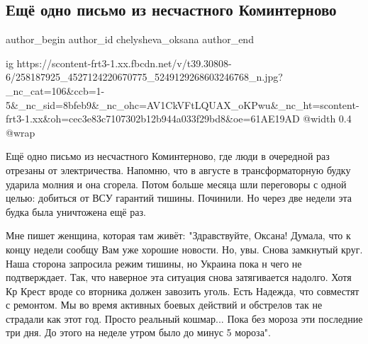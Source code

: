  
 
 
 
 
 
\subsection{Ещё одно письмо из несчастного Коминтерново}
\label{sec:21_11_2021.fb.chelysheva_oksana.1.pismo_kominternovo}
 
\ifcmt
 author_begin
   author_id chelysheva_oksana
 author_end
\fi

\ifcmt
  ig https://scontent-frt3-1.xx.fbcdn.net/v/t39.30808-6/258187925_4527124220670775_5249129268603246768_n.jpg?_nc_cat=106&ccb=1-5&_nc_sid=8bfeb9&_nc_ohc=AV1CkVFtLQUAX_oKPwu&_nc_ht=scontent-frt3-1.xx&oh=cec3e83c7107302b12b944a033f29bd8&oe=61AE19AD
  @width 0.4
  @wrap 
\fi

Ещё одно письмо из несчастного Коминтерново, где люди в очередной раз отрезаны
от электричества. Напомню, что в августе в трансформаторную будку ударила
молния и она сгорела. Потом больше месяца шли переговоры с одной целью:
добиться от ВСУ гарантий тишины. Починили. Но через две недели эта будка была
уничтожена ещё раз.

Мне пишет женщина, которая там живёт: "Здравствуйте, Оксана! Думала, что к концу
недели сообщу Вам уже хорошие новости. Но, увы. Снова замкнутый круг. Наша сторона
запросила режим тишины, но Украина пока н чего не подтверждает. Так, что наверное
эта ситуация снова затягивается надолго. Хотя Кр Крест вроде со вторника должен
завозить уголь. Есть Надежда, что совместят с ремонтом. Мы во время активных
боевых действий и обстрелов так не страдали как этот год. Просто реальный
кошмар... Пока без мороза эти последние три дня. До этого на неделе утром было
до минус 5 мороза".
